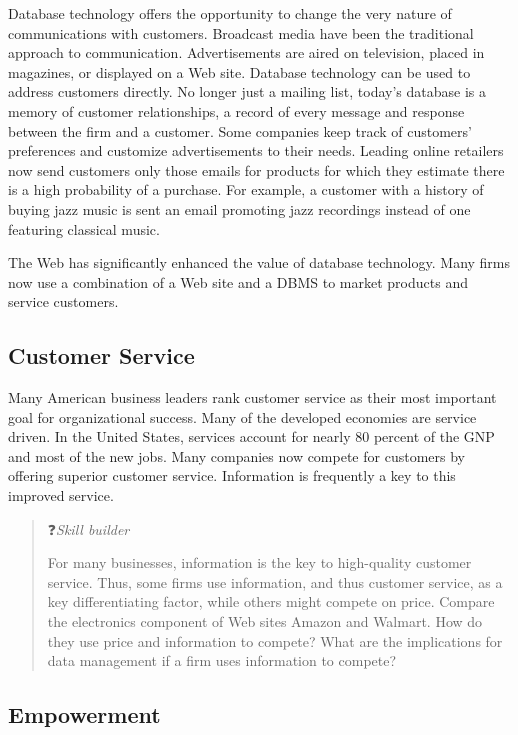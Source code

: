 \documentclass[
]{article}
\begin{document}
Database technology offers the opportunity to change the very nature of
communications with customers. Broadcast media have been the traditional
approach to communication. Advertisements are aired on television,
placed in magazines, or displayed on a Web site. Database technology can
be used to address customers directly. No longer just a mailing list,
today's database is a memory of customer relationships, a record of
every message and response between the firm and a customer. Some
companies keep track of customers' preferences and customize
advertisements to their needs. Leading online retailers now send
customers only those emails for products for which they estimate there
is a high probability of a purchase. For example, a customer with a
history of buying jazz music is sent an email promoting jazz recordings
instead of one featuring classical music.

The Web has significantly enhanced the value of database technology.
Many firms now use a combination of a Web site and a DBMS to market
products and service customers.

\hypertarget{customer-service}{%
\subsection*{Customer Service}\label{customer-service}}

Many American business leaders rank customer service as their most
important goal for organizational success. Many of the developed
economies are service driven. In the United States, services account for
nearly 80 percent of the GNP and most of the new jobs. Many companies
now compete for customers by offering superior customer service.
Information is frequently a key to this improved service.

\begin{quote}
❓\emph{Skill builder}

For many businesses, information is the key to high-quality customer
service. Thus, some firms use information, and thus customer service,
as a key differentiating factor, while others might compete on price.
Compare the electronics component of Web sites Amazon and Walmart. How
do they use price and information to compete? What are the
implications for data management if a firm uses information to
compete?
\end{quote}

\hypertarget{empowerment}{%
\subsection*{Empowerment}\label{empowerment}}
\end{document}
